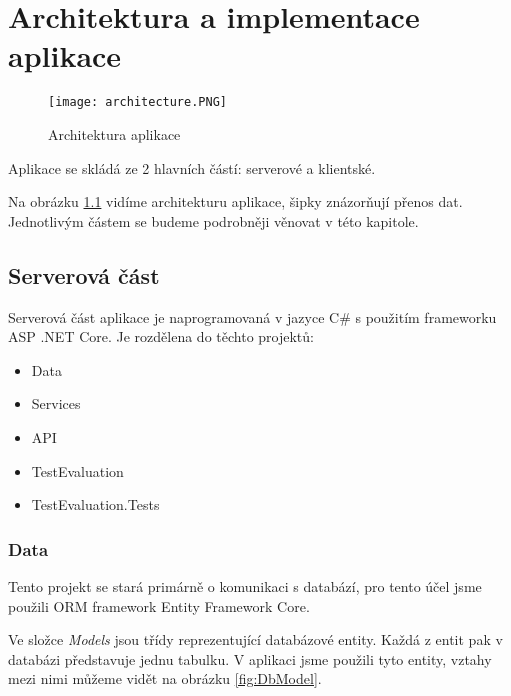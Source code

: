 \chapter{Architektura a implementace aplikace}

\begin{figure}
	\centering
	\texttt{[image: architecture.PNG]}
	\caption{Architektura aplikace}
	\label{fig:Architecture}
\end{figure}

Aplikace se skládá ze 2 hlavních částí: serverové a klientské.

Na obrázku \ref{fig:Architecture} vidíme architekturu aplikace, šipky znázorňují přenos dat. Jednotlivým částem se budeme podrobněji věnovat v této kapitole.

\section{Serverová část}

Serverová část aplikace je naprogramovaná v jazyce C\# s použitím 
frame\-worku ASP .NET Core. Je rozdělena do těchto projektů:

\begin{itemize}
	\item Data
	\item Services
	\item API
	\item TestEvaluation
	\item TestEvaluation.Tests
\end{itemize}

\subsection{Data}

Tento projekt se stará primárně o komunikaci s databází, pro tento účel jsme použili ORM framework Entity Framework Core. 

Ve složce \textit{Models} jsou třídy reprezentující databázové entity. Každá z entit pak v databázi představuje jednu tabulku. V aplikaci jsme použili tyto entity, vztahy mezi nimi můžeme vidět na obrázku \ref{fig:DbModel}.

